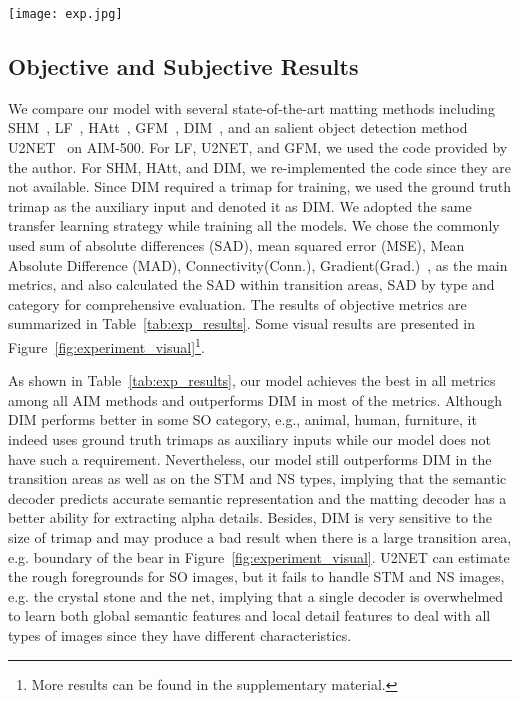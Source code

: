 \documentclass{article}
\begin{document}
\begin{figure*}[htb!]
    \texttt{[image: exp.jpg]}
    \caption{Some visual results of different methods on AIM-500. More results can be found in the supplementary material.}
    \label{fig:experiment_visual}
\end{figure*}

\subsection{Objective and Subjective Results}

We compare our model with several state-of-the-art matting methods including SHM~\cite{chen2018semantic}, LF~\cite{Qiao_2020_CVPR}, HAtt~\cite{Qiao_2020_CVPR}, GFM~\cite{gfm}, DIM~\cite{xu2017deep}, and an salient object detection method U2NET~\cite{u2net} on AIM-500. For LF, U2NET, and GFM, we used the code provided by the author. For SHM, HAtt, and DIM, we re-implemented the code since they are not available. Since DIM required a trimap for training, we used the ground truth trimap as the auxiliary input and denoted it as DIM. We adopted the same transfer learning strategy while training all the models. We chose the commonly used sum of absolute differences (SAD), mean squared error (MSE), Mean Absolute Difference (MAD), Connectivity(Conn.), Gradient(Grad.)~\cite{rhemann2009perceptually}, as the main metrics, and also calculated the SAD within transition areas, SAD by type and category for comprehensive evaluation. The results of objective metrics are summarized in Table~\ref{tab:exp_results}. Some visual results are presented in Figure~\ref{fig:experiment_visual}\footnote{More results can be found in the supplementary material.}. 

As shown in Table~\ref{tab:exp_results}, our model achieves the best in all metrics among all AIM methods and outperforms DIM in most of the metrics. Although DIM performs better in some SO category, e.g., animal, human, furniture, it indeed uses ground truth trimaps as auxiliary inputs while our model does not have such a requirement. Nevertheless, our model still outperforms DIM in the transition areas as well as on the STM and NS types, implying that the semantic decoder predicts accurate semantic representation and the matting decoder has a better ability for extracting alpha details. Besides, DIM is very sensitive to the size of trimap and may produce a bad result when there is a large transition area, e.g. boundary of the bear in Figure~\ref{fig:experiment_visual}. U2NET can estimate the rough foregrounds for SO images, but it fails to handle STM and NS images, e.g. the crystal stone and the net, implying that a single decoder is overwhelmed to learn both global semantic features and local detail features to deal with all types of images since they have different characteristics. 
\end{document}
